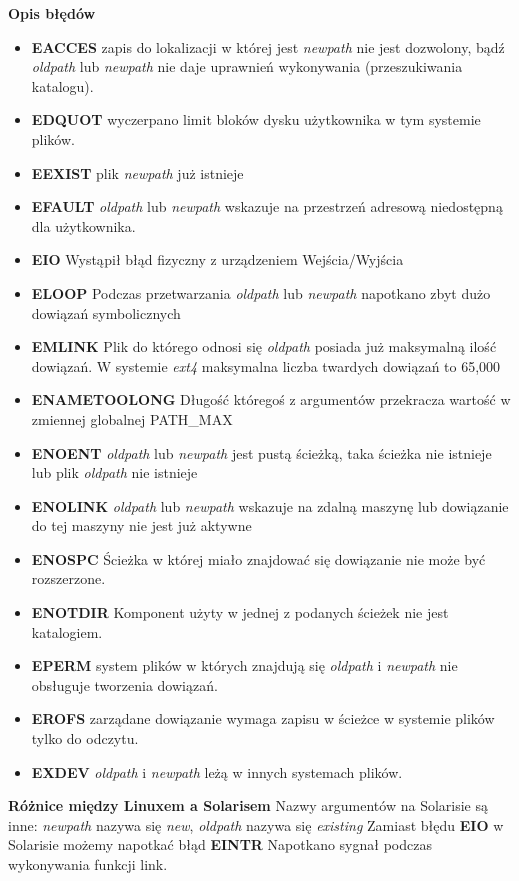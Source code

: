 \documentclass{article}
\begin{document}
\textbf{Opis błędów}
\begin{itemize}
\item \textbf{EACCES} zapis do lokalizacji w której jest \textit{newpath} nie jest dozwolony, bądź \textit{oldpath} lub \textit{newpath} nie daje uprawnień wykonywania (przeszukiwania katalogu).
\item \textbf{EDQUOT} wyczerpano limit bloków dysku użytkownika w tym systemie plików.
\item \textbf{EEXIST} plik \textit{newpath} już istnieje
\item \textbf{EFAULT} \textit{oldpath} lub \textit{newpath} wskazuje na przestrzeń adresową niedostępną dla użytkownika.
\item \textbf{EIO} Wystąpił błąd fizyczny z urządzeniem Wejścia/Wyjścia
\item \textbf{ELOOP} Podczas przetwarzania \textit{oldpath} lub \textit{newpath} napotkano zbyt dużo dowiązań symbolicznych
\item \textbf{EMLINK} Plik do którego odnosi się \textit{oldpath} posiada już maksymalną ilość dowiązań. W systemie \textit{ext4} maksymalna liczba twardych dowiązań to 65,000 
\item \textbf{ENAMETOOLONG} Długość któregoś z argumentów 
przekracza wartość w zmiennej globalnej PATH\_MAX
\item \textbf{ENOENT}  \textit{oldpath} lub \textit{newpath} jest pustą ścieżką, taka ścieżka nie istnieje lub plik  \textit{oldpath} nie istnieje
\item \textbf{ENOLINK}  \textit{oldpath} lub \textit{newpath} wskazuje na zdalną maszynę lub dowiązanie do tej maszyny nie jest już aktywne
\item \textbf{ENOSPC}  Ścieżka w której miało znajdować się dowiązanie nie może być rozszerzone.
\item \textbf{ENOTDIR}  Komponent użyty w jednej z podanych ścieżek nie jest katalogiem.
\item \textbf{EPERM} system plików w których znajdują się \textit{oldpath} i \textit{newpath} nie obsługuje tworzenia dowiązań.
\item \textbf{EROFS} zarządane dowiązanie wymaga zapisu w ścieżce w systemie plików tylko do odczytu.

\item \textbf{EXDEV} \textit{oldpath} i \textit{newpath} leżą w innych systemach plików.


\end{itemize}
\textbf{Różnice między Linuxem a Solarisem}
Nazwy argumentów na Solarisie są inne:
\textit{newpath} nazywa się \textit{new},
\textit{oldpath} nazywa się \textit{existing}
Zamiast błędu \textbf{EIO} w Solarisie możemy napotkać błąd
\textbf{EINTR} Napotkano sygnał podczas wykonywania funkcji link.
\end{document}
